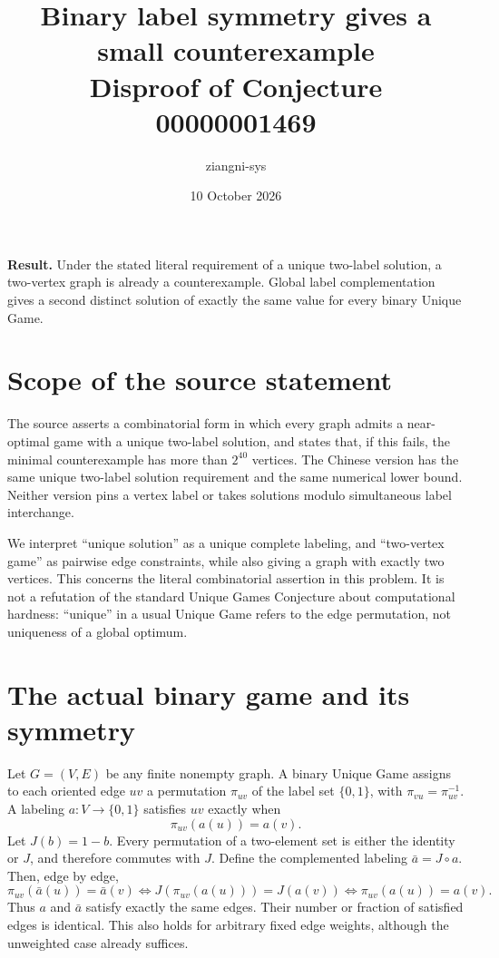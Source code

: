 \documentclass[11pt]{article}
\title{Binary label symmetry gives a small counterexample\\\large Disproof of Conjecture 00000001469}
\author{ziangni-sys}\date{10 October 2026}
\begin{document}
\maketitle
\noindent\textbf{Result.} Under the stated literal requirement of a unique two-label solution, a two-vertex graph is already a counterexample. Global label complementation gives a second distinct solution of exactly the same value for every binary Unique Game.

\section*{Scope of the source statement}
The source asserts a combinatorial form in which every graph admits a near-optimal game with a unique two-label solution, and states that, if this fails, the minimal counterexample has more than $2^{40}$ vertices. The Chinese version has the same unique two-label solution requirement and the same numerical lower bound. Neither version pins a vertex label or takes solutions modulo simultaneous label interchange.

We interpret ``unique solution'' as a unique complete labeling, and ``two-vertex game'' as pairwise edge constraints, while also giving a graph with exactly two vertices. This concerns the literal combinatorial assertion in this problem. It is not a refutation of the standard Unique Games Conjecture about computational hardness: ``unique'' in a usual Unique Game refers to the edge permutation, not uniqueness of a global optimum.

\section*{The actual binary game and its symmetry}
Let $G=(V,E)$ be any finite nonempty graph. A binary Unique Game assigns to each oriented edge $uv$ a permutation $\pi_{uv}$ of the label set $\{0,1\}$, with $\pi_{vu}=\pi_{uv}^{-1}$. A labeling $a:V\to\{0,1\}$ satisfies $uv$ exactly when
\[
 \pi_{uv}(a(u))=a(v).
\]
Let $J(b)=1-b$. Every permutation of a two-element set is either the identity or $J$, and therefore commutes with $J$. Define the complemented labeling $\bar a=J\circ a$. Then, edge by edge,
\[
 \pi_{uv}(\bar a(u))=\bar a(v)
 \iff J(\pi_{uv}(a(u)))=J(a(v))
 \iff \pi_{uv}(a(u))=a(v).
\]
Thus $a$ and $\bar a$ satisfy exactly the same edges. Their number or fraction of satisfied edges is identical. This also holds for arbitrary fixed edge weights, although the unweighted case already suffices.
\end{document}
